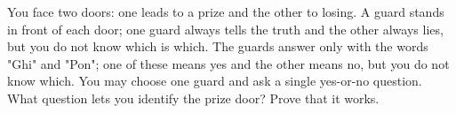 You face two doors: one leads to a prize and the other to losing. A guard stands in front of each door; one guard always tells the truth and the other always lies, but you do not know which is which. The guards answer only with the words "Ghi" and "Pon"; one of these means yes and the other means no, but you do not know which. You may choose one guard and ask a single yes-or-no question. What question lets you identify the prize door? Prove that it works.
